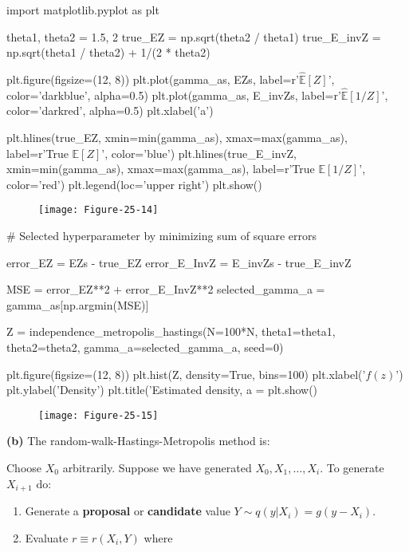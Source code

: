 \begin{python}
import matplotlib.pyplot as plt

theta1, theta2 = 1.5, 2
true_EZ = np.sqrt(theta2 / theta1)
true_E_invZ = np.sqrt(theta1 / theta2) + 1/(2 * theta2)

plt.figure(figsize=(12, 8))
plt.plot(gamma_as, EZs, label=r'$\hat{\mathbb{E}}[Z]$', color='darkblue', alpha=0.5)
plt.plot(gamma_as, E_invZs, label=r'$\hat{\mathbb{E}}[1 / Z]$', color='darkred', alpha=0.5)
plt.xlabel('a')

plt.hlines(true_EZ, xmin=min(gamma_as), xmax=max(gamma_as), label=r'True $\mathbb{E}[Z]$', color='blue')
plt.hlines(true_E_invZ, xmin=min(gamma_as), xmax=max(gamma_as), label=r'True $\mathbb{E}[1 / Z]$', color='red')
plt.legend(loc='upper right')
plt.show()
\end{python}

\begin{figure}[H]
\texttt{[image: Figure-25-14]}
\end{figure}

\begin{python}
# Selected hyperparameter by minimizing sum of square errors

error_EZ = EZs - true_EZ
error_E_InvZ = E_invZs - true_E_invZ

MSE = error_EZ**2 + error_E_InvZ**2
selected_gamma_a = gamma_as[np.argmin(MSE)]

Z = independence_metropolis_hastings(N=100*N, theta1=theta1, theta2=theta2, gamma_a=selected_gamma_a, seed=0)
\end{python}

\begin{python}
plt.figure(figsize=(12, 8))
plt.hist(Z, density=True, bins=100)
plt.xlabel('$f(z)$')
plt.ylabel('Density')
plt.title('Estimated density, a = %
plt.show()
\end{python}

\begin{figure}[H]
\texttt{[image: Figure-25-15]}
\end{figure}

\textbf{(b)} The random-walk-Hastings-Metropolis method is:

Choose \(X_0\) arbitrarily. Suppose we have generated
\(X_0, X_1, \dots, X_i\). To generate \(X_{i+1}\) do:

\begin{enumerate}[tightlist,label={\arabic*.}]
\item
  Generate a \textbf{proposal} or \textbf{candidate} value
  \(Y \sim q(y | X_i) = g(y - X_i)\).
\item
  Evaluate \(r \equiv r(X_i, Y)\) where
\end{enumerate}

